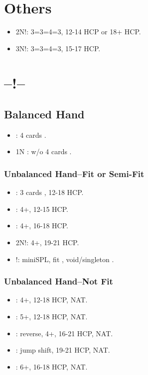 \documentclass[12pt,twoside,a5paper]{report}%
\begin{document}
	\section*{Others}
		\begin{itemize}
		\renewcommand{\labelitemi}{}
			\item 2N!: 3=3=4=3, 12-14 HCP or 18+ HCP.
			\item 3N!: 3=3=4=3, 15-17 HCP.
		\end{itemize}

	\section*{--!--}
		\subsection*{Balanced Hand}
		\begin{itemize}
		\renewcommand{\labelitemi}{}
			\item {} : 4 cards \he{}.
			\item 1N : w/o 4 cards \he{}.
		\end{itemize}
			
		\subsubsection*{Unbalanced Hand--Fit or Semi-Fit}
		\begin{itemize}
		\renewcommand{\labelitemi}{}	
			\item {} : 3 cards \he{}, 12-18 HCP.
			\item {} : 4+\he{}, 12-15 HCP.
			\item {} : 4+\he{}, 16-18 HCP.
			\item 2N!: 4+\he{}, 19-21 HCP.
			\item {}!: miniSPL, fit \he{}, void/singleton \di{}.
		\end{itemize}

		\subsubsection*{Unbalanced Hand--Not Fit}
		\begin{itemize}
		\renewcommand{\labelitemi}{}
			\item {} : 4+\sp{}, 12-18 HCP, NAT.
			\item {} : 5+\cl{}, 12-18 HCP, NAT.
			\item {} : reverse, 4+\di{}, 16-21 HCP, NAT.
			\item {} : jump shift, 19-21 HCP, NAT. 
			\item {} : 6+\cl{}, 16-18 HCP, NAT.
		\end{itemize}
\end{document}
